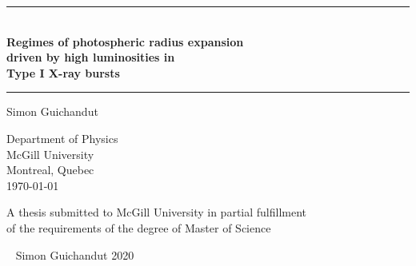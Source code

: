 \begin{titlepage}
\begin{center}
    \onehalfspacing

    \noindent\rule{\textwidth}{0.4pt}\\
    {\Large\textbf{Regimes of photospheric radius expansion}}\\
    \vspace*{1mm}
    {\Large\textbf{driven by high luminosities in}}\\
    \vspace*{1mm}
    {\Large\textbf{Type I X-ray bursts}}\\
    \vspace*{-3mm}
    \noindent\rule{\textwidth}{0.4pt}
    
    \vspace*{2.5cm}
    
    Simon Guichandut
    
    \vspace{2.5cm}
    
    Department of Physics\\
    McGill University\\
    Montreal, Quebec\\
    \today
    
    \vspace*{2.5cm}
    
    A thesis submitted to McGill University in partial fulfillment\\
    of the requirements of the degree of Master of Science\\
    
    \vfill
    
    \textcopyright~ Simon Guichandut 2020
    
\end{center}
\end{titlepage}